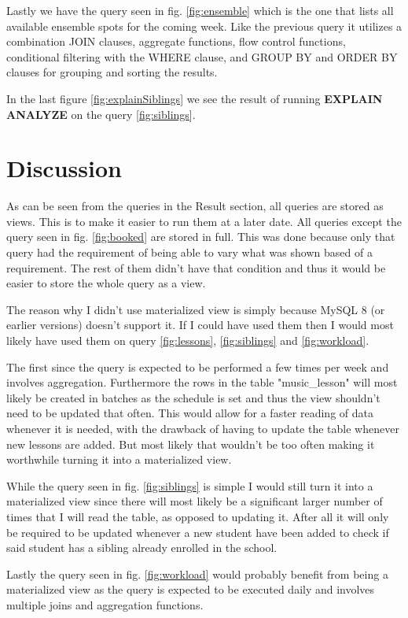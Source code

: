 \documentclass[a4paper]{scrreprt}
\begin{document}
Lastly we have the query seen in fig. \ref{fig:ensemble} which is the one that lists all available ensemble spots for the coming week. Like the previous query it utilizes a combination JOIN clauses, 
aggregate functions, flow control functions, conditional filtering with the WHERE clause, and GROUP BY and ORDER BY clauses for grouping and sorting the results.

In the last figure \ref{fig:explainSiblings} we see the result of running \textbf{EXPLAIN ANALYZE} on the query \ref{fig:siblings}.




\chapter{Discussion}
As can be seen from the queries in the Result section, all queries are stored as views. This is to make it easier to run them at a later date. All queries except the 
query seen in fig. \ref{fig:booked} are stored in full. This was done because only that query had the requirement of being able to vary what was shown based of a 
requirement. The rest of them didn't have that condition and thus it would be easier to store the whole query as a view. 

The reason why I didn't use materialized view is simply because MySQL 8 (or earlier versions) doesn't support it. If I could have used them then I would most 
likely have used them on query \ref{fig:lessons}, \ref{fig:siblings} and \ref{fig:workload}. 

The first since the query is expected to be performed a few times per week and involves aggregation. Furthermore the rows in the table "music\_lesson" will most likely be created in 
batches as the schedule is set and thus the view shouldn't need to be updated that often. This would allow for a faster reading of data whenever it is needed, with the drawback of having to update the 
table whenever new lessons are added. But most likely that wouldn't be too often making it worthwhile turning it into a materialized view.


While the query seen in fig. \ref{fig:siblings} is simple I would still turn it into a materialized view since there will most likely be a significant larger number of times that I will read the table,
as opposed to updating it. After all it will only be required to be updated whenever a new student have been added to check if said student has a sibling already enrolled in the school.

Lastly the query seen in fig. \ref{fig:workload} would probably benefit from being a materialized view as the query is expected to be executed daily and involves multiple joins and aggregation functions.
\end{document}
